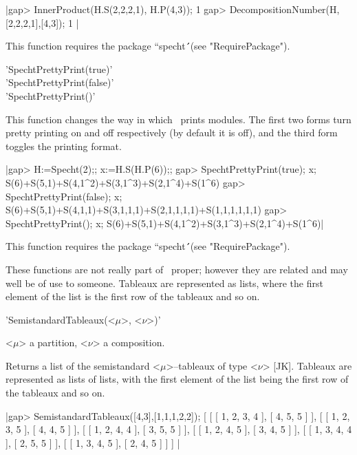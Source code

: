 |gap> InnerProduct(H.S(2,2,2,1), H.P(4,3));
1
gap> DecompositionNumber(H,[2,2,2,1],[4,3]);
1 |

This function requires the package ``specht\'\'\ (see "RequirePackage").



'SpechtPrettyPrint(true)' \\
'SpechtPrettyPrint(false)' \\
'SpechtPrettyPrint()'

This function changes the way in which \Specht\ prints modules. The first 
two forms turn pretty printing on and off respectively (by default it is 
off), and the third form toggles the printing format.

|gap> H:=Specht(2);; x:=H.S(H.P(6));;
gap> SpechtPrettyPrint(true); x;
S(6)+S(5,1)+S(4,1^2)+S(3,1^3)+S(2,1^4)+S(1^6)
gap> SpechtPrettyPrint(false); x;
S(6)+S(5,1)+S(4,1,1)+S(3,1,1,1)+S(2,1,1,1,1)+S(1,1,1,1,1,1)
gap> SpechtPrettyPrint(); x;     
S(6)+S(5,1)+S(4,1^2)+S(3,1^3)+S(2,1^4)+S(1^6)|

This function requires the package ``specht\'\'\ (see "RequirePackage").



These functions are not really part of \Specht\ proper; however they are 
related and may well be of use to someone. Tableaux are represented as
lists, where the first element of the list is the first row of the tableaux
and so on.



'SemistandardTableaux(<$\mu$>, <$\nu$>)'

<$\mu$> a partition, <$\nu$> a composition.

Returns a list of the semistandard <$\mu$>--tableaux of type <$\nu$> [JK].
Tableaux are represented as lists of lists, with the first element of
the list being the first row of the tableaux and so on.

|gap> SemistandardTableaux([4,3],[1,1,1,2,2]);    
[ [ [ 1, 2, 3, 4 ], [ 4, 5, 5 ] ], [ [ 1, 2, 3, 5 ], [ 4, 4, 5 ] ], 
  [ [ 1, 2, 4, 4 ], [ 3, 5, 5 ] ], [ [ 1, 2, 4, 5 ], [ 3, 4, 5 ] ], 
  [ [ 1, 3, 4, 4 ], [ 2, 5, 5 ] ], [ [ 1, 3, 4, 5 ], [ 2, 4, 5 ] ] ]
|

